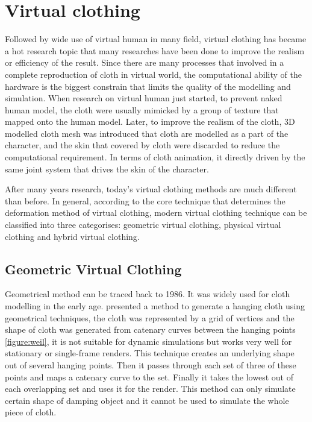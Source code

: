  
\section{Virtual clothing}

Followed by wide use of virtual human in many field, virtual clothing has became a hot research topic that many researches have been done to improve the realism or efficiency of the result. Since there are many processes that involved in a complete reproduction of cloth in virtual world, the computational ability of the hardware is the biggest constrain that limits the quality of the modelling and simulation. When research on virtual human just started, to prevent naked human model, the cloth were usually mimicked by a group of texture that mapped onto the human model. Later, to improve the realism of the cloth, 3D modelled cloth mesh was introduced that cloth are modelled as a part of the character, and the skin that covered by cloth were discarded to reduce the computational requirement. In terms of cloth animation, it directly driven by the same joint system that drives the skin of the character. 

After many years research, today's virtual clothing methods are much different than before. In general, according to the core technique that determines the deformation method of virtual clothing, modern virtual clothing technique can be classified into three categorises: geometric virtual clothing, physical virtual clothing and hybrid virtual clothing. 


\subsection{Geometric Virtual Clothing}

Geometrical method can be traced back to 1986. It was widely used for cloth modelling in the early age. \cite{Weil:1986} presented a  method to generate a hanging cloth using geometrical techniques, the cloth was represented by a grid of vertices and the shape of cloth was generated from catenary curves between the hanging points \ref{figure:weil}, it is not suitable for dynamic simulations but works very well for stationary or single-frame renders. This technique creates an underlying shape out of several hanging points. Then it passes through each set of three of these points and maps a catenary curve to the set. Finally it takes the lowest out of each overlapping set and uses it for the render. This method can only simulate certain shape of damping object and it cannot be used to simulate the whole piece of cloth.

